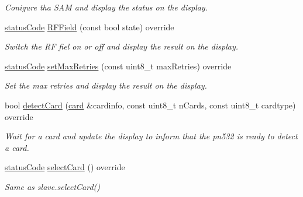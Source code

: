 \begin{DoxyCompactItemize}
\begin{DoxyCompactList}\small\item\em Conigure tha S\+AM and display the status on the display. \end{DoxyCompactList}\item 
\mbox{\label{classnfc_1_1NfcOled_a708a50eec4640caca921af9958c43972}} 
\hyperlink{declarations_8h_ae1d20c5a38cae82ccaa6a77be3fd264b}{status\+Code} \hyperlink{classnfc_1_1NfcOled_a708a50eec4640caca921af9958c43972}{R\+F\+Field} (const bool state) override
\begin{DoxyCompactList}\small\item\em Switch the RF fiel on or off and display the result on the display. \end{DoxyCompactList}\item 
\mbox{\label{classnfc_1_1NfcOled_a1c64d60d6008551a530d668acbdb5ede}} 
\hyperlink{declarations_8h_ae1d20c5a38cae82ccaa6a77be3fd264b}{status\+Code} \hyperlink{classnfc_1_1NfcOled_a1c64d60d6008551a530d668acbdb5ede}{set\+Max\+Retries} (const uint8\+\_\+t max\+Retries) override
\begin{DoxyCompactList}\small\item\em Set the max retries and display the result on the display. \end{DoxyCompactList}\item 
\mbox{\label{classnfc_1_1NfcOled_a8c233683d71236d6238d840eeeb5d626}} 
bool \hyperlink{classnfc_1_1NfcOled_a8c233683d71236d6238d840eeeb5d626}{detect\+Card} (\hyperlink{classcard}{card} \&cardinfo, const uint8\+\_\+t n\+Cards, const uint8\+\_\+t cardtype) override
\begin{DoxyCompactList}\small\item\em Wait for a card and update the display to inform that the pn532 is ready to detect a card. \end{DoxyCompactList}\item 
\mbox{\label{classnfc_1_1NfcOled_a7ae4a0942240950d8db41b75c898cb3c}} 
\hyperlink{declarations_8h_ae1d20c5a38cae82ccaa6a77be3fd264b}{status\+Code} \hyperlink{classnfc_1_1NfcOled_a7ae4a0942240950d8db41b75c898cb3c}{select\+Card} () override
\begin{DoxyCompactList}\small\item\em Same as slave.\+select\+Card() \end{DoxyCompactList}\item 

\end{DoxyCompactItemize}
